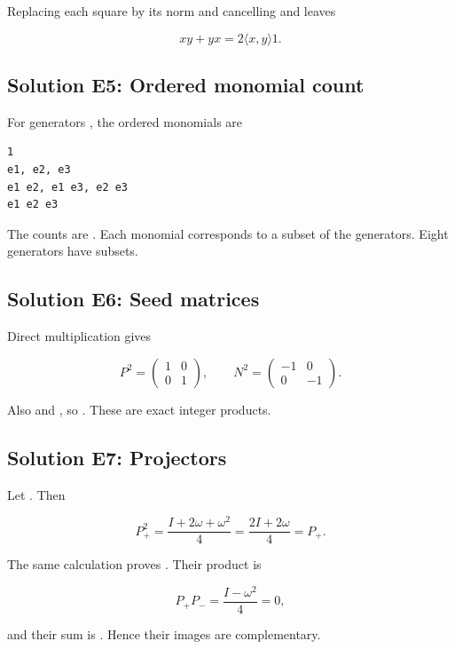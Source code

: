 \documentclass[11pt]{article}
\begin{document}
Replacing each square by its norm and cancelling \texttt{} and \texttt{} leaves

\[
xy+yx=2\langle x,y\rangle1.
\]

\subsection{Solution E5: Ordered monomial count}

For generators \texttt{}, the ordered monomials are

\begin{Verbatim}[fontsize=\small]
1
e1, e2, e3
e1 e2, e1 e3, e2 e3
e1 e2 e3
\end{Verbatim}

The counts are \texttt{}. Each monomial corresponds to a subset of the generators. Eight generators have \texttt{} subsets.

\subsection{Solution E6: Seed matrices}

Direct multiplication gives

\[
P^2=\begin{pmatrix}1&0\\0&1\end{pmatrix},
\qquad
N^2=\begin{pmatrix}-1&0\\0&-1\end{pmatrix}.
\]

Also \texttt{} and \texttt{}, so \texttt{}. These are exact integer products.

\subsection{Solution E7: Projectors}

Let \texttt{}. Then

\[
P_+^2=\frac{I+2\omega+\omega^2}{4}
=\frac{2I+2\omega}{4}=P_+.
\]

The same calculation proves \texttt{}. Their product is

\[
P_+P_-=\frac{I-\omega^2}{4}=0,
\]

and their sum is \texttt{}. Hence their images are complementary.
\end{document}
